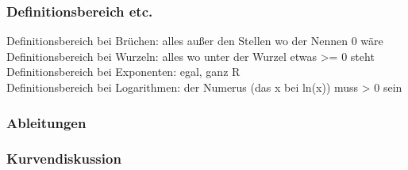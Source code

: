 \documentclass[6pt,a4paper]{scrartcl}
\begin{document}
\begin{multicols*}{2}
\subsubsection{Definitionsbereich etc.}
Definitionsbereich bei Brüchen: alles außer den Stellen wo der Nennen 0 wäre \\
Definitionsbereich bei Wurzeln: alles wo unter der Wurzel etwas >= 0 steht \\
Definitionsbereich bei Exponenten: egal, ganz R \\
Definitionsbereich bei Logarithmen: der Numerus (das x bei ln(x)) muss > 0 sein \\

\subsubsection{Ableitungen}

\subsubsection{Kurvendiskussion}


\end{multicols*}
\end{document}
